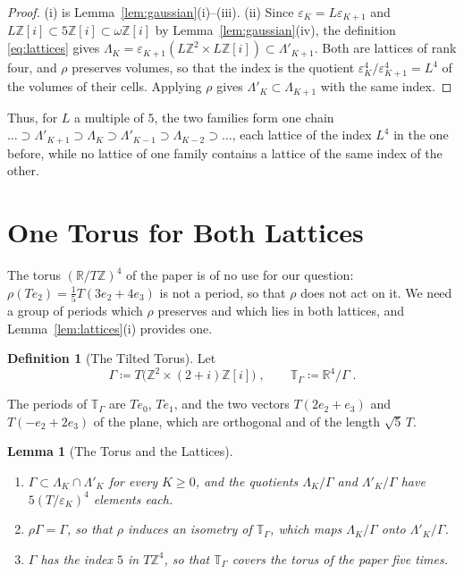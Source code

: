 \documentclass[11pt]{preprint}
\numberwithin{equation}{section}
\newtheorem{lemma}[theorem]{Lemma}
\theoremstyle{definition}
\newtheorem{definition}[theorem]{Definition}
\theoremstyle{remark}
\theoremstyle{plain}
\begin{document}
\begin{proof}
(i) is Lemma~\ref{lem:gaussian}(i)--(iii). (ii) Since $\varepsilon_K = L\varepsilon_{K+1}$ and $L\mathbb Z[i] \subset 5\mathbb Z[i] \subset \omega\mathbb Z[i]$ by Lemma~\ref{lem:gaussian}(iv), the definition \eqref{eq:lattices} gives $\Lambda_K = \varepsilon_{K+1}(L\mathbb Z^2 \times L\mathbb Z[i]) \subset \Lambda'_{K+1}$. Both are lattices of rank four, and $\rho$ preserves volumes, so that the index is the quotient $\varepsilon_K^4/\varepsilon_{K+1}^4 = L^4$ of the volumes of their cells. Applying $\rho$ gives $\Lambda'_K \subset \Lambda_{K+1}$ with the same index.
\end{proof}

Thus, for $L$ a multiple of $5$, the two families form one chain $\dots \supset \Lambda'_{K+1} \supset \Lambda_K \supset \Lambda'_{K-1} \supset \Lambda_{K-2} \supset \dots$, each lattice of the index $L^4$ in the one before, while no lattice of one family contains a lattice of the same index of the other.

\section{One Torus for Both Lattices}\label{sec:torus}

The torus $(\mathbb R/T\mathbb Z)^4$ of the paper is of no use for our question: $\rho(Te_2) = \frac15T(3e_2 + 4e_3)$ is not a period, so that $\rho$ does not act on it. We need a group of periods which $\rho$ preserves and which lies in both lattices, and Lemma~\ref{lem:lattices}(i) provides one.

\begin{definition}[The Tilted Torus]\label{def:tilted-torus}
Let
\begin{equation}\label{eq:periods}
    \Gamma \coloneqq T\bigl(\mathbb Z^2 \times (2 + i)\mathbb Z[i]\bigr)\;,
    \qquad
    \mathbb T_\Gamma \coloneqq \mathbb R^4/\Gamma\;.
\end{equation}
\end{definition}

The periods of $\mathbb T_\Gamma$ are $Te_0$, $Te_1$, and the two vectors $T(2e_2 + e_3)$ and $T(-e_2 + 2e_3)$ of the plane, which are orthogonal and of the length $\sqrt5\,T$.

\begin{lemma}[The Torus and the Lattices]\label{lem:torus}
\begin{enumerate}[label=(\roman*)]
\item $\Gamma \subset \Lambda_K \cap \Lambda'_K$ for every $K \geq 0$, and the quotients $\Lambda_K/\Gamma$ and $\Lambda'_K/\Gamma$ have $5(T/\varepsilon_K)^4$ elements each.
\item $\rho\Gamma = \Gamma$, so that $\rho$ induces an isometry of $\mathbb T_\Gamma$, which maps $\Lambda_K/\Gamma$ onto $\Lambda'_K/\Gamma$.
\item $\Gamma$ has the index $5$ in $T\mathbb Z^4$, so that $\mathbb T_\Gamma$ covers the torus of the paper five times.
\end{enumerate}
\end{lemma}
\end{document}
